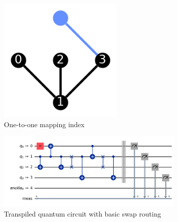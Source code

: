 \begin{figure}[htb]
    \begin{subfigure}{0.25\linewidth}
        \includegraphics[width=\linewidth]{image/coupling_map_trivial_basic.png}
        \caption{One-to-one mapping index}
        \label{fig:one-to-one-mapping}
    \end{subfigure}
    \hfill
    \begin{subfigure}{0.7\linewidth}
        \includegraphics[width=\linewidth]{image/swap_trivial_basic.png}
        \caption{Transpiled quantum circuit with basic swap routing}
        \label{fig:swap-trivial-basic}
    \end{subfigure}
    \hfill
    \begin{subfigure}{0.25\linewidth}

\end{subfigure}
\end{figure}
